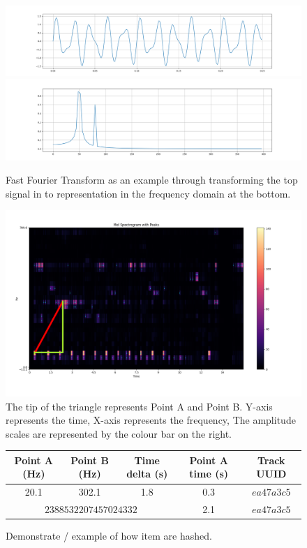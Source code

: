 \begin{figure}
    \centering
    \includegraphics[scale=0.2]{figures/FourierTransform.png}
    \includegraphics[scale=0.2]{figures/FourierTransformed.png}
    \caption{Fast Fourier Transform as an example through transforming the top signal in to representation in the frequency domain at the bottom.}
    \label{fig:fft}
\end{figure}



\begin{figure}
    \centering
    \includegraphics[scale=0.2]{figures/Delta_distance_demo.png}
    \caption{The tip of the triangle represents Point A and Point B. Y-axis represents the time, X-axis represents the frequency, The amplitude scales are represented by the colour bar on the right.}
    \label{fig:pairspicking}
\end{figure}

\begin{figure}
    \centering
    \small
        \begin{tabular}{|c|c|c|c|c|}
            \hline
            Point A (Hz) & Point B (Hz) & Time delta (s) & Point A time (s) & Track UUID \\
            \hline
            20.1 & 302.1 & 1.8 & 0.3 & $ea47a3c5$\\
            \hline
            \multicolumn{3}{|c|}{$2388532207457024332$} & 2.1 & $ea47a3c5$\\
            \hline
        \end{tabular}
    \caption{Demonstrate / example of how item are hashed. \cite{macleod_abracadabra_nodate}}
    \label{fig:hash}
\end{figure}


